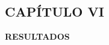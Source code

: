\begin{center}
    \section*{CAPÍTULO VI}
    \vspace*{0.5in}
    \textbf{RESULTADOS}
\end{center}

\newpage